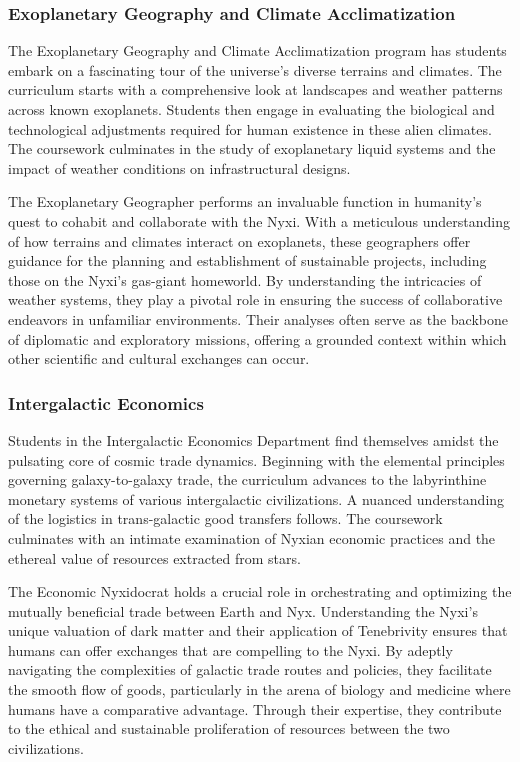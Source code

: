 \subsubsection{Exoplanetary Geography and Climate Acclimatization}
The Exoplanetary Geography and Climate Acclimatization program has students
embark on a fascinating tour of the universe's diverse terrains and climates.
The curriculum starts with a comprehensive look at landscapes and weather
patterns across known exoplanets. Students then engage in evaluating the
biological and technological adjustments required for human existence in these
alien climates. The coursework culminates in the study of exoplanetary liquid
systems and the impact of weather conditions on infrastructural designs.

The Exoplanetary Geographer performs an invaluable function in humanity's quest
to cohabit and collaborate with the Nyxi. With a meticulous understanding of
how terrains and climates interact on exoplanets, these geographers offer
guidance for the planning and establishment of sustainable projects, including
those on the Nyxi's gas-giant homeworld. By understanding the intricacies of
weather systems, they play a pivotal role in ensuring the success of
collaborative endeavors in unfamiliar environments. Their analyses often serve
as the backbone of diplomatic and exploratory missions, offering a grounded
context within which other scientific and cultural exchanges can occur.

\begin{center}
\end{center}

\subsubsection{Intergalactic Economics}
Students in the Intergalactic Economics Department find themselves amidst the
pulsating core of cosmic trade dynamics. Beginning with the elemental
principles governing galaxy-to-galaxy trade, the curriculum advances to the
labyrinthine monetary systems of various intergalactic civilizations. A nuanced
understanding of the logistics in trans-galactic good transfers follows. The
coursework culminates with an intimate examination of Nyxian economic practices
and the ethereal value of resources extracted from stars.

The Economic Nyxidocrat holds a crucial role in orchestrating and optimizing
the mutually beneficial trade between Earth and Nyx. Understanding the Nyxi's
unique valuation of dark matter and their application of Tenebrivity ensures
that humans can offer exchanges that are compelling to the Nyxi. By adeptly
navigating the complexities of galactic trade routes and policies, they
facilitate the smooth flow of goods, particularly in the arena of biology and
medicine where humans have a comparative advantage. Through their expertise,
they contribute to the ethical and sustainable proliferation of resources
between the two civilizations.

